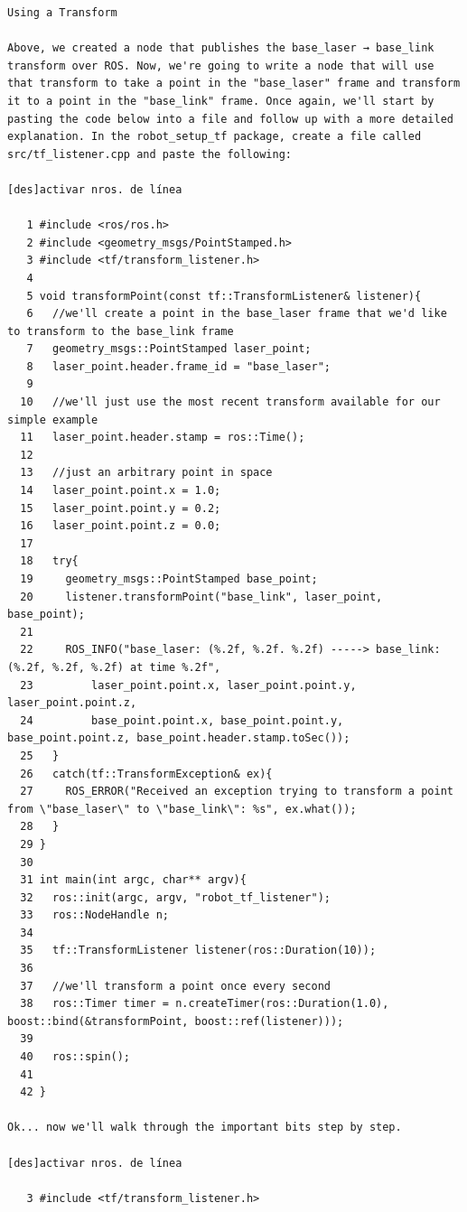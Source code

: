 \begin{verbatim}
Using a Transform

Above, we created a node that publishes the base_laser → base_link transform over ROS. Now, we're going to write a node that will use that transform to take a point in the "base_laser" frame and transform it to a point in the "base_link" frame. Once again, we'll start by pasting the code below into a file and follow up with a more detailed explanation. In the robot_setup_tf package, create a file called src/tf_listener.cpp and paste the following:

[des]activar nros. de línea

   1 #include <ros/ros.h>
   2 #include <geometry_msgs/PointStamped.h>
   3 #include <tf/transform_listener.h>
   4 
   5 void transformPoint(const tf::TransformListener& listener){
   6   //we'll create a point in the base_laser frame that we'd like to transform to the base_link frame
   7   geometry_msgs::PointStamped laser_point;
   8   laser_point.header.frame_id = "base_laser";
   9 
  10   //we'll just use the most recent transform available for our simple example
  11   laser_point.header.stamp = ros::Time();
  12 
  13   //just an arbitrary point in space
  14   laser_point.point.x = 1.0;
  15   laser_point.point.y = 0.2;
  16   laser_point.point.z = 0.0;
  17 
  18   try{
  19     geometry_msgs::PointStamped base_point;
  20     listener.transformPoint("base_link", laser_point, base_point);
  21 
  22     ROS_INFO("base_laser: (%.2f, %.2f. %.2f) -----> base_link: (%.2f, %.2f, %.2f) at time %.2f",
  23         laser_point.point.x, laser_point.point.y, laser_point.point.z,
  24         base_point.point.x, base_point.point.y, base_point.point.z, base_point.header.stamp.toSec());
  25   }
  26   catch(tf::TransformException& ex){
  27     ROS_ERROR("Received an exception trying to transform a point from \"base_laser\" to \"base_link\": %s", ex.what());
  28   }
  29 }
  30 
  31 int main(int argc, char** argv){
  32   ros::init(argc, argv, "robot_tf_listener");
  33   ros::NodeHandle n;
  34 
  35   tf::TransformListener listener(ros::Duration(10));
  36 
  37   //we'll transform a point once every second
  38   ros::Timer timer = n.createTimer(ros::Duration(1.0), boost::bind(&transformPoint, boost::ref(listener)));
  39 
  40   ros::spin();
  41 
  42 }

Ok... now we'll walk through the important bits step by step.

[des]activar nros. de línea

   3 #include <tf/transform_listener.h>


\end{verbatim}
